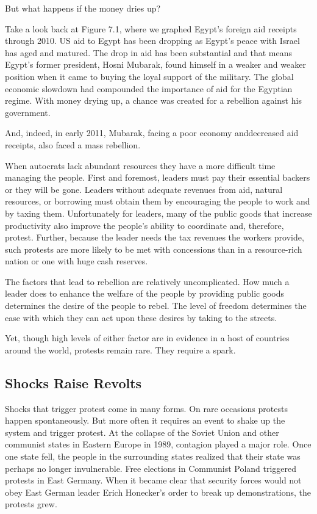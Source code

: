 \documentclass[10pt]{article}
\begin{document}
{\large But what happens if the money dries up?}

{\large Take a look back at Figure 7.1, where we graphed Egypt's foreign aid
receipts through 2010. US aid to Egypt has been dropping as Egypt's peace with
Israel has aged and matured. The drop in aid has been substantial and that means
Egypt's former president, Hosni Mubarak, found himself in a weaker and weaker
position when it came to buying the loyal support of the military. The global
economic slowdown had compounded the importance of aid for the Egyptian regime.
With money drying up, a chance was created for a rebellion against his
government.}

{\large And, indeed, in early 2011, Mubarak, facing a poor economy anddecreased
aid receipts, also faced a mass rebellion.}

{\large When autocrats lack abundant resources they have a more difficult time
managing the people. First and foremost, leaders must pay their essential backers
or they will be gone. Leaders without adequate revenues from aid, natural
resources, or borrowing must obtain them by encouraging the people to work and by
taxing them. Unfortunately for leaders, many of the public goods that increase
productivity also improve the people's ability to coordinate and, therefore,
protest. Further, because the leader needs the tax revenues the workers provide,
such protests are more likely to be met with concessions than in a resource-rich
nation or one with huge cash reserves.}

{\large The factors that lead to rebellion are relatively uncomplicated. How
much a leader does to enhance the welfare of the people by providing public goods
determines the desire of the people to rebel. The level of freedom determines the
ease with which they can act upon these desires by taking to the streets.}

{\large Yet, though high levels of either factor are in evidence in a host of
countries around the world, protests remain rare. They require a spark.}

\subsection{Shocks Raise Revolts}

{\large Shocks that trigger protest come in many forms. On rare occasions
protests happen spontaneously. But more often it requires an event to shake up
the system and trigger protest. At the collapse of the Soviet Union and other
communist states in Eastern Europe in 1989, contagion played a major role. Once
one state fell, the people in the surrounding states realized that their state
was perhaps no longer invulnerable. Free elections in Communist Poland triggered
protests in East Germany. When it became clear that security forces would not
obey East German leader Erich Honecker's order to break up demonstrations, the
protests grew.}
\end{document}
